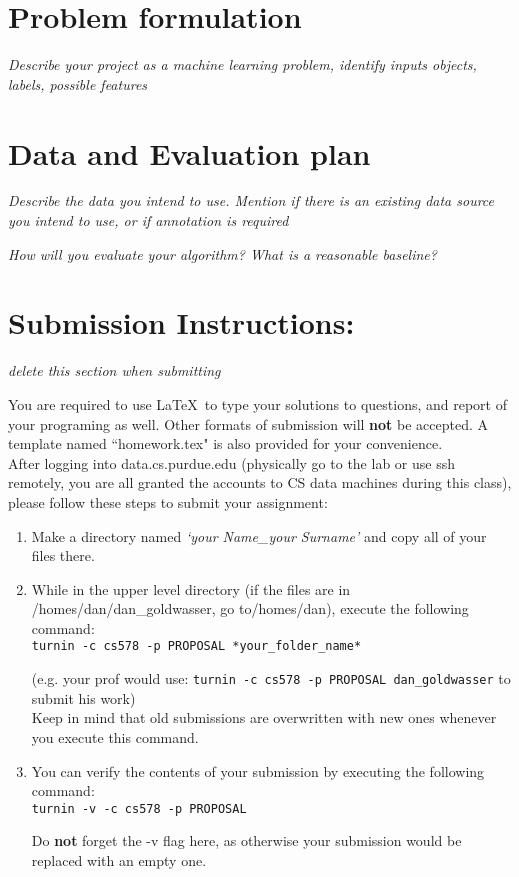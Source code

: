 \documentclass[11pt]{article}
\begin{document}
\section{Problem formulation}
\textit{Describe your project as a machine learning problem, identify inputs objects, labels, possible features}

\section{Data and Evaluation plan}
\textit{Describe the data you intend to use. Mention if there is an existing data source you intend to use, or if annotation is required}

\textit{How will you evaluate your algorithm? What is a reasonable baseline?}



\section*{Submission Instructions:} 
\textit{delete this section when submitting}

You are required to use \LaTeX \, to type your solutions to questions, and report of your programing as well. Other formats of submission will \textbf{not} be accepted. A template named ``homework.tex" is also provided for your convenience.\\

After logging into data.cs.purdue.edu (physically go to the lab or use ssh remotely, you are all granted the accounts to CS data machines during this class), please follow these steps to submit your assignment:
\begin{enumerate}
	\item Make a directory named \textit{`your Name\_your Surname'} and copy all of your files there.
	\item While in the upper level directory (if the files are in /homes/dan/dan\_goldwasser, go to/homes/dan), execute the following command:\\

	\texttt{turnin -c cs578 -p PROPOSAL *your\_folder\_name*}
		
	(e.g. your prof would use: \texttt{turnin -c cs578 -p PROPOSAL dan\_goldwasser} to submit his work)\\
		
	Keep in mind that old submissions are overwritten with new ones whenever you execute this
command.\\

	\item You can verify the contents of your submission by executing the following command:\\
	
	\texttt{turnin -v -c cs578 -p PROPOSAL\\}

	Do \textbf{not} forget the -v flag here, as otherwise your submission would be replaced with an empty
one.
\end{enumerate}


%

\end{document}
